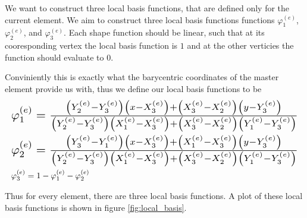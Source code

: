 \documentclass[../fem.tex]{subfiles}
\begin{document}
We want to construct three local basis functions, that are defined only for the
current element. We aim to construct three local basis functions functions
$\varphi_1^{(e)}$, $\varphi_2^{(e)}$, and $\varphi_3^{(e)}$.  Each shape
function should be linear, such that at its cooresponding vertex the local
basis function is $1$ and at the other verticies the function should evaluate
to $0$.


Conviniently this is exactly what the barycentric coordinates of the master
element provide us with, thus we define our local basis functions to be
\begin{align}\label{eq:local_basis}
  &\resizebox{\columnwidth}{!}{$
    \varphi_1^{(e)}=
  \frac{\left(Y^{(e)}_2-Y^{(e)}_3\right)\left(x-X^{(e)}_3\right)+\left(X^{(e)}_3-X^{(e)}_2\right)\left(y-Y^{(e)}_3\right)}{\left(Y^{(e)}_2-Y^{(e)}_3\right)\left(X^{(e)}_1-X^{(e)}_3\right)+\left(X^{(e)}_3-X^{(e)}_2\right)\left(Y^{(e)}_1-Y^{(e)}_3\right)}
  $}\\
  &\resizebox{\columnwidth}{!}{$
    \varphi_2^{(e)}=
    \frac{\left(Y^{(e)}_3-Y^{(e)}_1\right)\left(x-X^{(e)}_3\right)+\left(X^{(e)}_1-X^{(e)}_3\right)\left(y-Y^{(e)}_3\right)}{\left(Y^{(e)}_2-Y^{(e)}_3\right)\left(X^{(e)}_1-X^{(e)}_3\right)+\left(X^{(e)}_3-X^{(e)}_2\right)\left(Y^{(e)}_1-Y^{(e)}_3\right)}
  $}\\
  &\varphi_3^{(e)}=1-\varphi_1^{(e)}-\varphi_2^{(e)}
\end{align}

Thus for every element, there are three local basis functions. A plot of these
local basis functions is shown in figure \ref{fig:local_basis}.

\begin{Figure}
   \begin{center}
   \end{center}
   \label{fig:local_basis}
\end{Figure}
\end{document}
